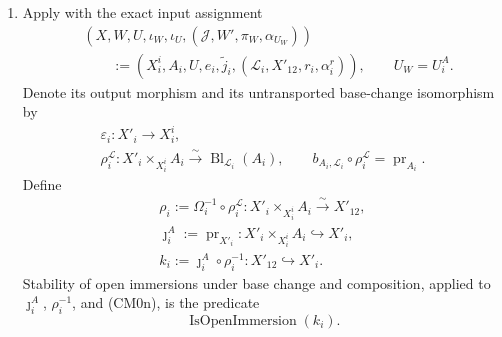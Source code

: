 \begin{definition}
\begin{enumerate}
    \item Apply  with the exact
      input assignment
      \[
      \begin{aligned}
        &(X,W,U,\iota_W,\iota_U,
          (\mathcal J,W',\pi_W,\alpha_{U_W}))\\
        &\qquad:=
          (X_i^i,A_i,U,e_i,\widetilde j_i,
            (\mathcal L_i,X'_{12},r_i,\alpha_i^r)),
        \qquad U_W=U_i^A.
      \end{aligned}                                                \tag{CM0m}
      \]
      Denote its output morphism and its untransported base-change
      isomorphism by
      \[
      \begin{gathered}
        \varepsilon_i\colon X'_i\longrightarrow X_i^i,\\
        \rho_i^{\mathcal L}\colon
          X'_i\times_{X_i^i}A_i
            \xrightarrow{\sim}\operatorname{Bl}_{\mathcal L_i}(A_i),
        \qquad
        b_{A_i,\mathcal L_i}\circ\rho_i^{\mathcal L}
          =\operatorname{pr}_{A_i}.
      \end{gathered}
      \]
      Define
      \[
      \begin{gathered}
        \rho_i:=\Omega_i^{-1}\circ\rho_i^{\mathcal L}
          \colon X'_i\times_{X_i^i}A_i\xrightarrow{\sim}X'_{12},\\
        \jmath_i^A:=\operatorname{pr}_{X'_i}
          \colon X'_i\times_{X_i^i}A_i\hookrightarrow X'_i,\\
        k_i:=\jmath_i^A\circ\rho_i^{-1}
          \colon X'_{12}\hookrightarrow X'_i.
      \end{gathered}                                               \tag{CM0n}
      \]
      Stability of open immersions under base change and composition, applied
      to \(\jmath_i^A\), \(\rho_i^{-1}\), and (CM0n), is the predicate
      \[
        \operatorname{IsOpenImmersion}(k_i).                      \tag{CM0o}
      \]


\end{enumerate}
\end{definition}
